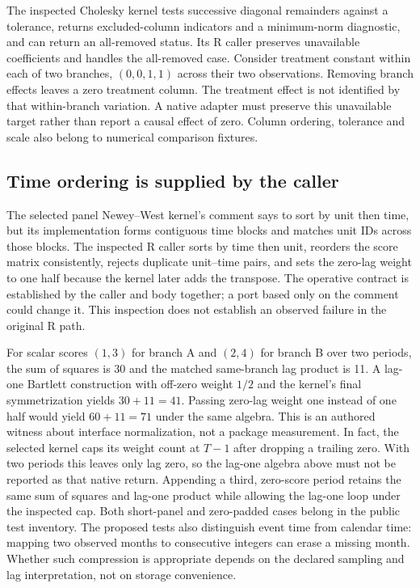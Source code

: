 The inspected Cholesky kernel tests successive diagonal remainders against
a tolerance, returns excluded-column indicators and a minimum-norm diagnostic,
and can return an all-removed status. Its R caller preserves unavailable
coefficients and handles the all-removed case. Consider treatment constant
within each of two branches, $(0,0,1,1)$ across their two observations.
Removing branch effects leaves a zero treatment column. The treatment effect
is not identified by that within-branch variation. A native adapter must
preserve this unavailable target rather than report a causal effect of zero.
Column ordering, tolerance and scale also belong to numerical comparison
fixtures.~\citep{exec25_panelcxx_fixest,exec20_fixest_source,exec25_panelcxx_reference}

\subsection{Time ordering is supplied by the caller}
The selected panel Newey--West kernel's comment says to sort by unit then
time, but its implementation forms contiguous time blocks and matches unit
IDs across those blocks. The inspected R caller sorts by time then unit,
reorders the score matrix consistently, rejects duplicate unit--time pairs,
and sets the zero-lag weight to one half because the kernel later adds the
transpose. The operative contract is established by the caller and body
together; a port based only on the comment could change it. This inspection
does not establish an observed failure in the original R path.
\citep{exec25_panelcxx_fixest,exec20_fixest_source}

For scalar scores $(1,3)$ for branch A and $(2,4)$ for branch B over two
periods, the sum of squares is 30 and the matched same-branch lag product
is 11. A lag-one Bartlett construction with off-zero weight $1/2$ and the
kernel's final symmetrization yields $30+11=41$. Passing zero-lag weight
one instead of one half would yield $60+11=71$ under the same algebra.
This is an authored witness about interface normalization, not a package
measurement. In fact, the selected kernel caps its weight count at $T-1$
after dropping a trailing zero. With two periods this leaves only lag zero,
so the lag-one algebra above must not be reported as that native return.
Appending a third, zero-score period retains the same sum of squares and
lag-one product while allowing the lag-one loop under the inspected cap.
Both short-panel and zero-padded cases belong in the public test inventory.
\citep{exec25_panelcxx_fixest,exec25_panelcxx_reference} The proposed tests also distinguish event time from calendar
time: mapping two observed months to consecutive integers can erase a
missing month. Whether such compression is appropriate depends on the
declared sampling and lag interpretation, not on storage convenience.
\citep{exec25_panelcxx_reference}

